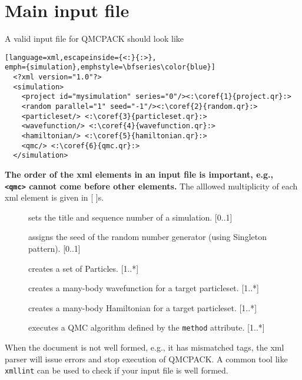 \section{Main input file}\label{input.intro}

A valid input file for QMCPACK should look like

\begin{lstlisting}[language=xml,escapeinside={<:}{:>},
emph={simulation},emphstyle=\bfseries\color{blue}]
  <?xml version="1.0"?>
  <simulation>
    <project id="mysimulation" series="0"/><:\coref{1}{project.qr}:>
    <random parallel="1" seed="-1"/><:\coref{2}{random.qr}:>
    <particleset/> <:\coref{3}{particleset.qr}:>
    <wavefunction/> <:\coref{4}{wavefunction.qr}:>
    <hamiltonian/> <:\coref{5}{hamiltonian.qr}:>
    <qmc/> <:\coref{6}{qmc.qr}:>
  </simulation> 
\end{lstlisting}

\textbf{The order of the xml elements in an input file is important, e.g., {\tt
<qmc>} cannot come before other elements.} The alllowed multiplicity of each
xml element is given in [ ]s. 

\begin{description}
\item[{\hyperref[project.qr]{}}]
sets the title and sequence number of a simulation. [0..1]
\item[{\hyperref[random.qr]{}}]
assigns the seed of the random number generator (using Singleton pattern). [0..1] 
\item[{\hyperref[particleset.qr]{}}]
creates a set of Particles. [1..*]
\item[{\hyperref[wavefunction.qr]{}}]
creates a many-{}body wavefunction for a target particleset.  [1..*]
\item[{\hyperref[hamiltonian.qr]{}}]
creates a many-{}body Hamiltonian for a target particleset. [1..*]
\item[{\hyperref[qmc.qr]{}}]
executes a QMC algorithm defined by the {\tt method} attribute. [1..*]
\end{description}

When the document is not well formed, e.g., it has mismatched tags, the xml
parser will issue errors and stop execution of QMCPACK. A common tool like {\tt
xmllint} can be used to check if your input file is well formed.  


